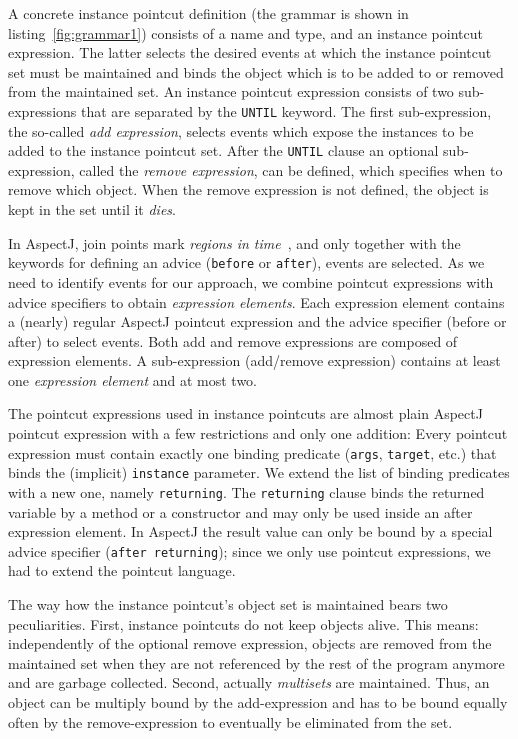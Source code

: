 \documentclass{sig-alternate}
\begin{document}
A concrete instance pointcut definition (the grammar is shown in listing~\ref{fig:grammar1}) consists of a name and type, and an instance pointcut expression.
The latter selects the desired events at which the instance pointcut set must be maintained and binds the object which is to be added to or removed from the maintained set.
An instance pointcut expression consists of two sub-expressions that are separated by the \lstinline{UNTIL} keyword.
The first sub-expression, the so-called \emph{add expression}, selects events which expose the instances to be added to the instance pointcut set.
After the \lstinline{UNTIL} clause an optional sub-expression, called the \emph{remove expression}, can be defined, which specifies when to remove which object.
When the remove expression is not defined, the object is kept in the set until it \emph{dies}.

In AspectJ, join points mark \emph{regions in time}~\cite{masuharafine}, and only together with the keywords for defining an advice (\lstinline!before! or \lstinline!after!), events are selected.
As we need to identify events for our approach, we combine pointcut expressions with advice specifiers to obtain \emph{expression elements}.
Each expression element contains a (nearly) regular AspectJ pointcut expression and the advice specifier (before or after) to select events.
Both add and remove expressions are composed of expression elements.
A sub-expression (add/remove expression) contains at least one \emph{expression element} and at most two.

The pointcut expressions used in instance pointcuts are almost plain AspectJ pointcut expression with a few restrictions and only one addition:
Every pointcut expression must contain exactly one binding predicate (\lstinline{args}, \lstinline{target}, etc.) that binds the (implicit) \lstinline{instance} parameter. We extend the list of binding predicates with a new one, namely \lstinline{returning}.
The \lstinline{returning} clause binds the returned variable by a method or a constructor and may only be used inside an after expression element.
In AspectJ the result value can only be bound by a special advice specifier (\lstinline{after returning}); since we only use pointcut expressions, we had to extend the pointcut language.

The way how the instance pointcut's object set is maintained bears two peculiarities.
First, instance pointcuts do not keep objects alive.
This means: independently of the optional remove expression, objects are removed from the maintained set when they are not referenced by the rest of the program anymore and are garbage collected.
Second, actually \emph{multisets} are maintained. Thus, an object can be multiply bound by the add-expression and has to be bound equally often by the remove-expression to eventually be eliminated from the set.
\end{document}
